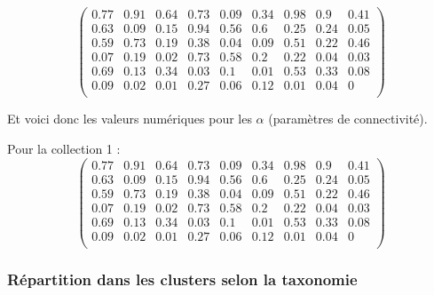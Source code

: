 \normalsize\newline\[\begin{pmatrix} 0.77 &0.91 &0.64 &0.73 &0.09 &0.34 &0.98 &0.9 &0.41 \\0.63 &0.09 &0.15 &0.94 &0.56 &0.6 &0.25 &0.24 &0.05 \\0.59 &0.73 &0.19 &0.38 &0.04 &0.09 &0.51 &0.22 &0.46 \\0.07 &0.19 &0.02 &0.73 &0.58 &0.2 &0.22 &0.04 &0.03 \\0.69 &0.13 &0.34 &0.03 &0.1 &0.01 &0.53 &0.33 &0.08 \\0.09 &0.02 &0.01 &0.27 &0.06 &0.12 &0.01 &0.04 &0 \\ \end{pmatrix}\]

Et voici donc les valeurs numériques pour les \(\alpha\) (paramètres de
connectivité).

Pour la collection 1 :
\[\begin{pmatrix} 0.77 &0.91 &0.64 &0.73 &0.09 &0.34 &0.98 &0.9 &0.41 \\0.63 &0.09 &0.15 &0.94 &0.56 &0.6 &0.25 &0.24 &0.05 \\0.59 &0.73 &0.19 &0.38 &0.04 &0.09 &0.51 &0.22 &0.46 \\0.07 &0.19 &0.02 &0.73 &0.58 &0.2 &0.22 &0.04 &0.03 \\0.69 &0.13 &0.34 &0.03 &0.1 &0.01 &0.53 &0.33 &0.08 \\0.09 &0.02 &0.01 &0.27 &0.06 &0.12 &0.01 &0.04 &0 \\ \end{pmatrix}\]

\hypertarget{ruxe9partition-dans-les-clusters-selon-la-taxonomie-2}{%
\subsubsection{Répartition dans les clusters selon la
taxonomie}\label{ruxe9partition-dans-les-clusters-selon-la-taxonomie-2}}

